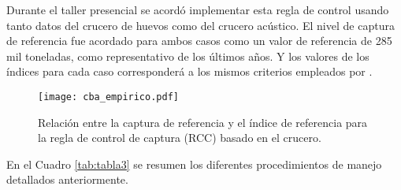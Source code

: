Durante el taller presencial se acordó implementar esta regla de control usando tanto datos del crucero de huevos como del crucero acústico. El nivel de captura de referencia fue acordado para ambos casos como un valor de referencia de 285 mil toneladas, como representativo de los últimos años. Y los valores de los índices para cada caso corresponderá a los mismos criterios empleados por \cite{canales2021empirical}. 
\newline

\begin{figure}[H]
    \centering
    \texttt{[image: cba\_empirico.pdf]}  
    \caption{Relación entre la captura de referencia y el índice de referencia para la regla de control de
    captura (RCC) basado en el crucero.}
    \label{fig:cba_empirico.pdf}
\end{figure} 


En el Cuadro \ref{tab:tabla3} se resumen los diferentes procedimientos de manejo detallados anteriormente.

